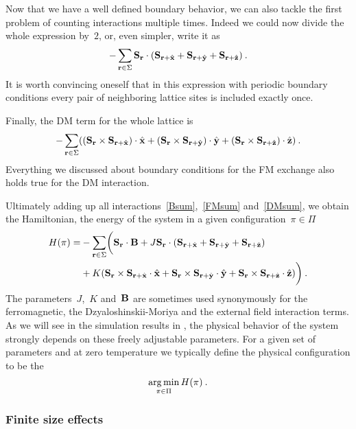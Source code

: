 Now that we have a well defined boundary behavior, we can also tackle the first
problem of counting interactions multiple times. Indeed we could now divide the
whole expression by~$2$, or, even simpler, write it as
%
\begin{equation}\label{FMsum}
  -\sum_{\mathbf{r} \in \Sigma} \mathbf{S}_{\mathbf{r}} \cdot
    (\mathbf{S}_{\mathbf{r} + \hat{\mathbf{x}}} + \mathbf{S}_{\mathbf{r} + \hat{\mathbf{y}}} + \mathbf{S}_{\mathbf{r} + \hat{\mathbf{z}}})\:.
\end{equation}
%
It is worth convincing oneself that in this expression with periodic boundary
conditions every pair of neighboring lattice sites is included exactly once.

Finally, the DM term for the whole lattice is
%
\begin{equation}\label{DMsum}
  -\sum_{\mathbf{r} \in \Sigma} ((\mathbf{S}_{\mathbf{r}} \times \mathbf{S}_{\mathbf{r} + \hat{\mathbf{x}}}) \cdot \hat{\mathbf{x}} +
    (\mathbf{S}_{\mathbf{r}} \times \mathbf{S}_{\mathbf{r} + \hat{\mathbf{y}}}) \cdot \hat{\mathbf{y}} +
    (\mathbf{S}_{\mathbf{r}} \times \mathbf{S}_{\mathbf{r} + \hat{\mathbf{z}}}) \cdot \hat{\mathbf{z}})\:.
\end{equation}
%
Everything we discussed about boundary conditions for the FM exchange also holds
true for the DM interaction.

Ultimately adding up all interactions~\eqref{Bsum},~\eqref{FMsum}
and~\eqref{DMsum}, we obtain the Hamiltonian, \ie{} the energy of the system in
a given configuration~$\pi \in \Pi$
%
\begin{align}\label{hamiltonian}
  H(\pi) = &-\sum_{\mathbf{r} \in \Sigma}\biggl(\mathbf{S}_{\mathbf{r}} \cdot \mathbf{B} +
      J \mathbf{S}_{\mathbf{r}} \cdot (\mathbf{S}_{\mathbf{r}+\hat{\mathbf{x}}} + \mathbf{S}_{\mathbf{r}+\hat{\mathbf{y}}} + \mathbf{S}_{\mathbf{r}+\hat{\mathbf{z}}}) \\
      &+ K (\mathbf{S}_{\mathbf{r}} \times \mathbf{S}_{\mathbf{r}+\hat{\mathbf{x}}} \cdot \hat{\mathbf{x}} +
            \mathbf{S}_{\mathbf{r}} \times \mathbf{S}_{\mathbf{r}+\hat{\mathbf{y}}} \cdot \hat{\mathbf{y}} +
            \mathbf{S}_{\mathbf{r}} \times \mathbf{S}_{\mathbf{r}+\hat{\mathbf{z}}} \cdot \hat{\mathbf{z}})\biggr)\:.
\end{align}
%
The parameters~$J$,~$K$ and~$\mathbf{B}$ are sometimes used synonymously for the
ferromagnetic, the Dzyaloshinskii-Moriya and the external field interaction
terms. As we will see in the simulation results in , the
physical behavior of the system strongly depends on these freely adjustable
parameters. For a given set of parameters and at zero temperature we typically
define the physical configuration to be the
%
\begin{equation}\label{objective}
  \operatorname*{arg\,min}_{\pi \in \Pi} H(\pi)\:.
\end{equation}

\subsubsection{Finite size effects}

